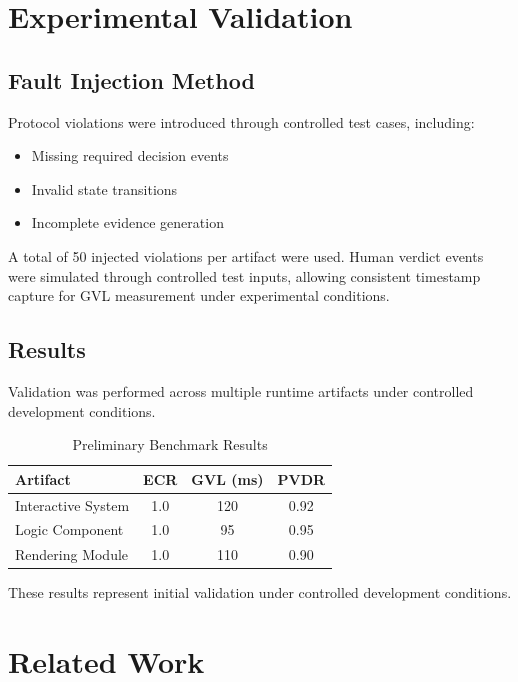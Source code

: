 \documentclass[conference]{IEEEtran}
\begin{document}
\section{Experimental Validation}

\subsection{Fault Injection Method}

Protocol violations were introduced through controlled test cases, including:
\begin{itemize}
    \item Missing required decision events
    \item Invalid state transitions
    \item Incomplete evidence generation
\end{itemize}
A total of 50 injected violations per artifact were used.
Human verdict events were simulated through controlled test inputs, allowing
consistent timestamp capture for GVL measurement under experimental conditions.

\subsection{Results}

Validation was performed across multiple runtime artifacts under controlled
development conditions.

\begin{table}[h]
  \centering
  \caption{Preliminary Benchmark Results}
  \label{tab:results}
  \begin{tabular}{|l|c|c|c|}
    \hline
    \textbf{Artifact} & \textbf{ECR} & \textbf{GVL (ms)} & \textbf{PVDR} \\
    \hline
    Interactive System & 1.0 & 120 & 0.92 \\
    Logic Component    & 1.0 &  95 & 0.95 \\
    Rendering Module   & 1.0 & 110 & 0.90 \\
    \hline
  \end{tabular}
\end{table}

These results represent initial validation under controlled development conditions.

\section{Related Work}
\end{document}
